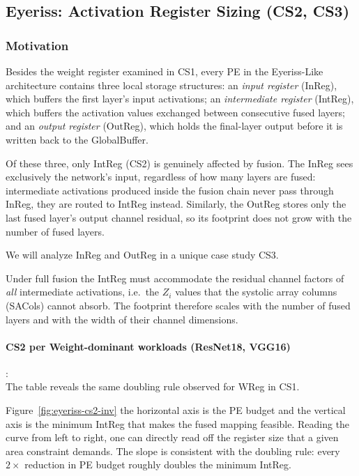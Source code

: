\subsection{Eyeriss: Activation Register Sizing (CS2, CS3)}
\label{sec:eyeriss-cs2-cs3}

\subsubsection{Motivation}

Besides the weight register examined in CS1, every PE in the
Eyeriss-Like architecture contains three local storage
structures: an \emph{input register} (InReg), which buffers the
first layer's input activations; an \emph{intermediate register}
(IntReg), which buffers the activation values exchanged between
consecutive fused layers; and an \emph{output register} (OutReg),
which holds the final-layer output before it is written back to the
GlobalBuffer.

Of these three, only IntReg (CS2) is genuinely affected by fusion.
The InReg sees exclusively the network's input, regardless of how
many layers are fused: intermediate activations produced inside the
fusion chain never pass through InReg, they are routed to IntReg
instead.
Similarly, the OutReg stores only the last fused layer's output
channel residual, so its footprint does not grow with the number of
fused layers.

We will analyze InReg and OutReg in a unique case study CS3.

Under full fusion the IntReg must accommodate the residual channel
factors of \emph{all} intermediate activations, i.e.\ the $Z_i$
values that the systolic array columns (SACols) cannot absorb.
The footprint therefore scales with the number of fused layers and
with the width of their channel dimensions.


\label{sec:eyeriss-cs2}

\paragraph{CS2 per Weight-dominant workloads (ResNet18, VGG16)}: \\



The table reveals the same doubling rule observed for WReg in CS1.


Figure~\ref{fig:eyeriss-cs2-inv} the horizontal axis is the PE budget and the vertical axis is
the minimum IntReg that makes the fused mapping feasible.
Reading the curve from left to right, one can directly read off the
register size that a given area constraint demands.
The slope is consistent with the doubling rule: every $2\times$
reduction in PE budget roughly doubles the minimum IntReg.


